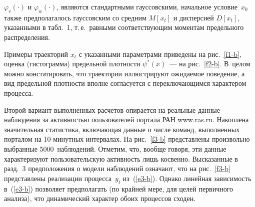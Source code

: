 \begin{multicols}{2}
\addtocounter{table}{1}
  

\noindent
 $\varphi_v(\cdot)$ и $\varphi_w(\cdot)$, являются стандартными гауссовскими, 
начальное условие~$x_0$ также предполагалось гауссовским со средним $M[x_t]$ и 
дисперсией $D[x_t]$, указанными в табл.~1, т.\,е.\ равными со\-от\-вет\-ст\-ву\-ющим моментам 
предельного распределения.


  Примеры траекторий $x_t$ с указанными па\-ра\-мет\-ра\-ми приведены на рис.~\ref{f1-b}, 
оценка (гистограмма) предельной плотности $\psi^*(x)$~--- на рис.~\ref{f2-b}. В~целом 
можно констатировать, что траектории иллюстрируют ожидаемое поведение, а вид 
предельной плотности вполне согласуется с переключающимся характером процесса.


  Второй вариант выполненных расчетов опирается на реальные данные~--- наблюдения за 
активностью пользователей портала РАН {\sf www.ras.ru}. Накоплена значительная 
статистика, включающая данные о числе команд, выполненных порталом на 10-ми\-нут\-ных
интервалах. На рис.~\ref{f3-b} представлены произвольно выбранные 5000~наблюдений. 
Отметим, что, вообще говоря, эти данные характеризуют пользовательскую активность лишь 
косвенно. Высказанные в разд.~3 предположения о модели наблюдений означают, что на 
рис.~\ref{f3-b} представлены реализации процесса~$y_t$ из~(\ref{e3-b}). Однако линейная 
зависимость в~(\ref{e3-b}) позволяет предполагать (по крайней мере, для целей первичного 
анализа), что динамический характер обоих процессов сходен.

\begin{figure*} %
\vspace*{1pt}
\begin{minipage}[t]{80mm}
\begin{center}
\mbox{%
\epsfxsize=79mm
}
\end{center}
\vspace*{-11pt}
\end{minipage}
\hfill
\vspace*{1pt}
\begin{minipage}[t]{80mm}
\begin{center}
\mbox{%
\epsfxsize=78.808mm
}
\end{center}
\vspace*{-11pt}
\end{minipage}
\vspace*{-6pt}
\end{figure*}


\end{multicols}
